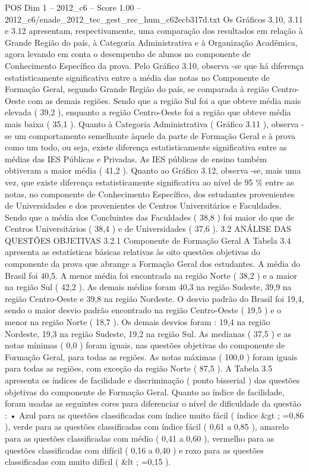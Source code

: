 \begin{textsample}{POS Dim 1 – 2012\_c6 – Score 1.00 – 2012\_c6/enade\_2012\_tec\_gest\_rec\_hum\_c62ecb317d.txt}
Os Gráficos 3.10, 3.11 e 3.12 apresentam, respectivamente, uma comparação dos resultados em relação à Grande Região do país, à Categoria Administrativa e à Organização Acadêmica, agora levando em conta o desempenho de alunos no componente de Conhecimento Específico da prova.
Pelo Gráfico 3.10, observa -se que há diferença estatisticamente significativa entre a média das notas no Componente de Formação Geral, segundo Grande Região do país, se comparada à região Centro-Oeste com as demais regiões.
Sendo que a região Sul foi a que obteve média mais elevada ( 39,2 ), enquanto a região Centro-Oeste foi a região que obteve média mais baixa ( 35,1 ).
Quanto à Categoria Administrativa ( Gráfico 3.11 ), observa -se um comportamento semelhante àquele da parte de Formação Geral e à prova como um todo, ou seja, existe diferença estatisticamente significativa entre as médias das IES Públicas e Privadas.
As IES públicas de ensino também obtiveram a maior média ( 41,2 ).
Quanto ao Gráfico 3.12, observa -se, mais uma vez, que existe diferença estatisticamente significativa ao nível de 95 \% entre as notas, no componente de Conhecimento Específico, dos estudantes provenientes de Universidades e dos provenientes de Centros Universitários e Faculdades.
Sendo que a média dos Concluintes das Faculdades ( 38,8 ) foi maior do que de Centros Universitários ( 38,4 ) e de Universidades ( 37,6 ). 3.2 ANÁLISE DAS QUESTÕES OBJETIVAS 3.2.1 Componente de Formação Geral A Tabela 3.4 apresenta as estatísticas básicas relativas às oito questões objetivas do componente da prova que abrange a Formação Geral dos estudantes.
A média do Brasil foi 40,5.
A menor média foi encontrada na região Norte ( 38,2 ) e a maior na região Sul ( 42,2 ).
As demais médias foram 40,3 na região Sudeste, 39,9 na região Centro-Oeste e 39,8 na região Nordeste.
O desvio padrão do Brasil foi 19,4, sendo o maior desvio padrão encontrado na região Centro-Oeste ( 19,5 ) e o menor na região Norte ( 18,7 ).
Os demais desvios foram : 19,4 na região Nordeste, 19,3 na região Sudeste, 19,2 na região Sul.
As medianas ( 37,5 ) e as notas mínimas ( 0,0 ) foram iguais, nas questões objetivas do componente de Formação Geral, para todas as regiões.
As notas máximas ( 100,0 ) foram iguais para todas as regiões, com exceção da região Norte ( 87,5 ).
A Tabela 3.5 apresenta os índices de facilidade e discriminação ( ponto bisserial ) das questões objetivas do componente de Formação Geral.
Quanto ao índice de facilidade, foram usadas as seguintes cores para diferenciar o nível de dificuldade da questão : • Azul para as questões classificadas com índice muito fácil ( índice \&gt ; =0,86 ), verde para as questões classificadas com índice fácil ( 0,61 a 0,85 ), amarelo para as questões classificadas com médio ( 0,41 a 0,60 ), vermelho para as questões classificadas com difícil ( 0,16 a 0,40 ) e roxo para as questões classificadas com muito difícil ( \&lt ; =0,15 ).

\end{textsample}
